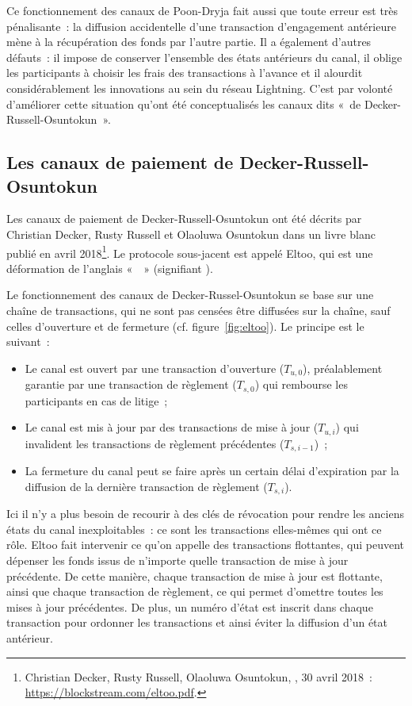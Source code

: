 Ce fonctionnement des canaux de Poon-Dryja fait aussi que toute erreur est très pénalisante~: la diffusion accidentelle d'une transaction d'engagement antérieure mène à la récupération des fonds par l'autre partie. Il a également d'autres défauts~: il impose de conserver l'ensemble des états antérieurs du canal, il oblige les participants à choisir les frais des transactions à l'avance et il alourdit considérablement les innovations au sein du réseau Lightning. C'est par volonté d'améliorer cette situation qu'ont été conceptualisés les canaux dits «~de Decker-Russell-Osuntokun~».


\subsection{Les canaux de paiement de Decker-Russell-Osuntokun} Les canaux de paiement de Decker-Russell-Osuntokun ont été décrits par Christian Decker, Rusty Russell et Olaoluwa Osuntokun dans un livre blanc publié en avril 2018\footnote{Christian Decker, Rusty Russell, Olaoluwa Osuntokun, , 30 avril 2018~: \url{https://blockstream.com/eltoo.pdf}.}. Le protocole sous-jacent est appelé Eltoo, qui est une déformation de l'anglais «~~» (signifiant ).

Le fonctionnement des canaux de Decker-Russel-Osuntokun se base sur une chaîne de transactions, qui ne sont pas censées être diffusées sur la chaîne, sauf celles d'ouverture et de fermeture (cf. figure~\ref{fig:eltoo}). Le principe est le suivant~:

\begin{itemize}
\item Le canal est ouvert par une transaction d'ouverture ($T_{u,0}$), préalablement garantie par une transaction de règlement ($T_{s,0}$) qui rembourse les participants en cas de litige~;
\item Le canal est mis à jour par des transactions de mise à jour ($T_{u,i}$) qui invalident les transactions de règlement précédentes ($T_{s,i-1}$)~;
\item La fermeture du canal peut se faire après un certain délai d'expiration par la diffusion de la dernière transaction de règlement ($T_{s,i}$).
\end{itemize}

Ici il n'y a plus besoin de recourir à des clés de révocation pour rendre les anciens états du canal inexploitables~: ce sont les transactions elles-mêmes qui ont ce rôle. Eltoo fait intervenir ce qu'on appelle des transactions flottantes, qui peuvent dépenser les fonds issus de n'importe quelle transaction de mise à jour précédente. De cette manière, chaque transaction de mise à jour est flottante, ainsi que chaque transaction de règlement, ce qui permet d'omettre toutes les mises à jour précédentes. De plus, un numéro d'état est inscrit dans chaque transaction pour ordonner les transactions et ainsi éviter la diffusion d'un état antérieur. %

